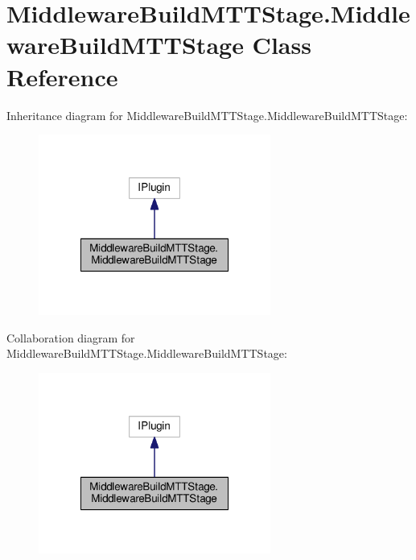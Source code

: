 \hypertarget{classMiddlewareBuildMTTStage_1_1MiddlewareBuildMTTStage}{\section{Middleware\-Build\-M\-T\-T\-Stage.\-Middleware\-Build\-M\-T\-T\-Stage Class Reference}
\label{classMiddlewareBuildMTTStage_1_1MiddlewareBuildMTTStage}
}


Inheritance diagram for Middleware\-Build\-M\-T\-T\-Stage.\-Middleware\-Build\-M\-T\-T\-Stage\-:
\nopagebreak
\begin{figure}[H]
\begin{center}
\leavevmode
\includegraphics[width=216pt]{classMiddlewareBuildMTTStage_1_1MiddlewareBuildMTTStage__inherit__graph}
\end{center}
\end{figure}


Collaboration diagram for Middleware\-Build\-M\-T\-T\-Stage.\-Middleware\-Build\-M\-T\-T\-Stage\-:
\nopagebreak
\begin{figure}[H]
\begin{center}
\leavevmode
\includegraphics[width=216pt]{classMiddlewareBuildMTTStage_1_1MiddlewareBuildMTTStage__coll__graph}
\end{center}
\end{figure}
